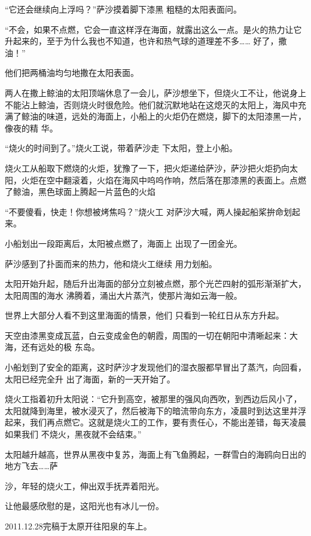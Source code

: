 \documentclass{article}
\begin{document}
“它还会继续向上浮吗？”萨沙摸着脚下漆黑
粗糙的太阳表面问。 

“不会，如果不点燃，它会一直这样浮在海面，就露出这么一点。是火的热力让它升起来的，至于为什么我也不知道，也许和热气球的道理差不多……
好了，撒油！” 


他们把两桶油均匀地撒在太阳表面。 

两人在撒上鲸油的太阳顶端休息了一会儿，萨沙想坐下，但烧火工不让，他说身上不能沾上鲸油，否则烧火时很危险。他们就沉默地站在这熄灭的太阳上，海风中充满了鲸油的味道，远处的海面上，小船上的火炬仍在燃烧，脚下的太阳漆黑一片，像夜的精
华。 

\newpage

“烧火的时间到了。”烧火工说，带着萨沙走
下太阳，登上小船。 

烧火工从船取下燃烧的火炬，犹豫了一下，把火炬递给萨沙，萨沙把火炬扔向太阳，火炬在空中翻滚着，火焰在海风中呜呜作响，然后落在那漆黑的表面上。点燃了鲸油，黑色球面上腾起一片蓝色的火焰

“不要傻看，快走！你想被烤焦吗？”烧火工
对萨沙大喊，两人操起船桨拚命划起来。 

小船划出一段距离后，太阳被点燃了，海面上
出现了一团金光。 

萨沙感到了扑面而来的热力，他和烧火工继续
用力划船。 

太阳开始升起，随后升出海面的部分立刻被点燃，那个光芒四射的弧形渐渐扩大，太阳周围的海水
沸腾着，涌出大片蒸汽，使那片海如云海一般。 

\newpage

世界上大部分人看不到这里海面的情景，他们
只看到一轮红日从东方升起。 

天空由漆黑变成瓦蓝，白云变成金色的朝霞，周围的一切在朝阳中清晰起来：大海，还有远处的极
东岛。 

小船划到了安全的距离，这时萨沙才发现他们的湿衣服都早冒出了蒸汽，向回看，太阳已经完全升
出了海面，新的一天开始了。 

烧火工指着初升太阳说：“它升到高空，被那里的强风向西吹，到西边后风小了，太阳就降到海里，被水浸灭了，然后被海下的暗流带向东方，凌晨时到达这里并浮起来，我们再点燃它。这就是烧火工的工作，要有责任心，不能出差错，每天凌晨如果我们
不烧火，黑夜就不会结束。” 

太阳越升越高，世界从黑夜中复苏，海面上有飞鱼腾起，一群雪白的海鸥向日出的地方飞去……萨

\newpage
沙，年轻的烧火工，伸出双手抚弄着阳光。 


让他最感欣慰的是，这阳光也有冰儿一份。 

2011.12.28完稿于太原开往阳泉的车上。
\end{document}
